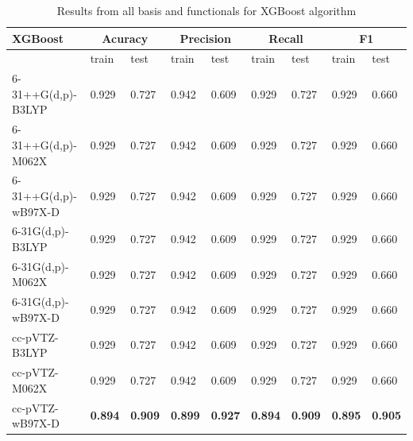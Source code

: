 \begin{table}[H]
\centering
\caption{Results from all basis and functionals for XGBoost algorithm}
\begin{tabular}{|l |l |l |l |l |l |l |l |l|}\hline      
XGBoost& \multicolumn{2}{|c|}{Acuracy} & \multicolumn{2}{|c|}{Precision} & \multicolumn{2}{|c|}{Recall} & \multicolumn{2}{|c|}{F1} \\\hline
 & train & test & train & test & train & test & train & test \\\hline
6-31++G(d,p)-B3LYP & 0.929 & 0.727 & 0.942 & 0.609 & 0.929 & 0.727 & 0.929 & 0.660 \\\hline
6-31++G(d,p)-M062X & 0.929 & 0.727 & 0.942 & 0.609 & 0.929 & 0.727 & 0.929 & 0.660 \\\hline
6-31++G(d,p)-wB97X-D & 0.929 & 0.727 & 0.942 & 0.609 & 0.929 & 0.727 & 0.929 & 0.660 \\\hline
6-31G(d,p)-B3LYP & 0.929 & 0.727 & 0.942 & 0.609 & 0.929 & 0.727 & 0.929 & 0.660 \\\hline
6-31G(d,p)-M062X & 0.929 & 0.727 & 0.942 & 0.609 & 0.929 & 0.727 & 0.929 & 0.660 \\\hline
6-31G(d,p)-wB97X-D & 0.929 & 0.727 & 0.942 & 0.609 & 0.929 & 0.727 & 0.929 & 0.660 \\\hline
cc-pVTZ-B3LYP & 0.929 & 0.727 & 0.942 & 0.609 & 0.929 & 0.727 & 0.929 & 0.660 \\\hline
cc-pVTZ-M062X & 0.929 & 0.727 & 0.942 & 0.609 & 0.929 & 0.727 & 0.929 & 0.660 \\\hline
cc-pVTZ-wB97X-D & \textbf{0.894} & \textbf{0.909} & \textbf{0.899} & \textbf{0.927} & \textbf{0.894} & \textbf{0.909} & \textbf{0.895} & \textbf{0.905} \\ \hline

\end{tabular}
\label{tab:my_table2}
\end{table}



